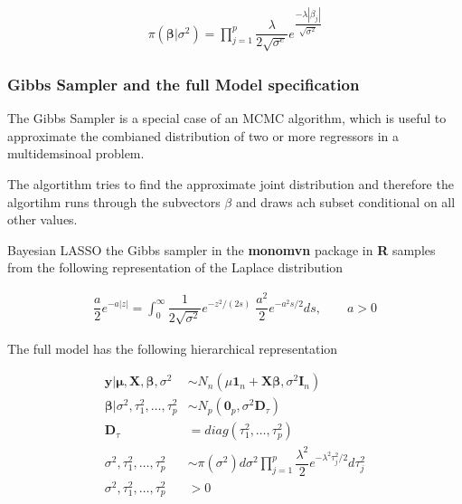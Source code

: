 \documentclass[12pt,a4paper]{article}
\begin{document}
\begin{align} 
\label{eq:la_bay_prior}
 \pi \left( \pmb{\beta} | \sigma^2 \right)   = \prod_{j = 1}^{p} \dfrac{\lambda}{2 \sqrt{\sigma^e}} e^{\dfrac{- \lambda |\beta_j |}{\sqrt{\sigma^2}}} 
\end{align}

\autocite{park_bayesian_2008}

\hypertarget{gibbs-sampler-and-the-full-model-specification}{%
\subsubsection{Gibbs Sampler and the full Model
specification}\label{gibbs-sampler-and-the-full-model-specification}}

The Gibbs Sampler is a special case of an \ac{MCMC} algorithm, which is
useful to approximate the combianed distribution of two or more
regressors in a multidemsinoal problem.

The algortithm tries to find the approximate joint distribution and
therefore the algortihm runs through the subvectors \(\beta\) and draws
ach subset conditional on all other values.
\autocite{gelman_bayesian_2004}

Bayesian \ac{LASSO} the Gibbs sampler in the \textbf{monomvn} package in
\textbf{R} \autocite{gramacy_monomvn_2019} samples from the following
representation of the Laplace distribution

\begin{align} 
\label{eq:gibbs}
  \dfrac{a}{2}e^{-a |z|} = \int_{0}^{\infty} \dfrac{1}{2 \sqrt{\sigma^2}} e^{ -z^2 / (2s)} \; \dfrac{a^2}{2} e^{ -a^2 s /2} ds, \qquad a > 0 
\end{align}

\textcite{andrews_scale_1974}

The full model has the following hierarchical representation

\begin{align} 
\label{eq:hier}
  \pmb{y|\mu}, \pmb{X}, \pmb{\beta}, \sigma^2 & \sim N_n (\mu \pmb{1}_n + \pmb{X \beta}, \sigma^2  \pmb{I}_n)   \nonumber\\
  \pmb{\beta} | \sigma^2, \tau^2_1 , \ldots , \tau^2_p & \sim N_p (\pmb{0}_p , \sigma^2 \pmb{D}_{\tau}) \nonumber \\
  \pmb{D}_{\tau} & = diag(\tau^2_1 , \ldots , \tau^2_p)\\
  \sigma^2, \tau^2_1 , \ldots , \tau^2_p & \sim \pi \left( \sigma^2 \right) d \sigma^2 \prod_{j = 1}^{p} \dfrac{\lambda^2}{2}e^{- \lambda^2 \tau^2_j /2} d \tau^2_j \nonumber \\
  \sigma^2, \tau^2_1 , \ldots , \tau^2_p & > 0 \nonumber \\
\end{align}
\end{document}
